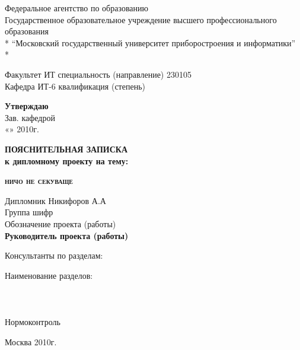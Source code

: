 \begin{titlepage}
\newpage

\begin{center}
Федеральное агентство по образованию \\
\vspace{1cm}
Государственное образовательное учреждение высшего профессионального образования \\*
“Московский государственный университет приборостроения и информатики” \\*
\end{center}

\begin{center}
Факультет ИТ  специальность (направление) 230105 \\
Кафедра ИТ-6  квалификация (степень) \\
\end{center}

\begin{flushright}
\textbf{Утверждаю} \\
Зав. кафедрой \\ 
«»       2010г.
\end{flushright}

\vfill

\begin{center}
\textbf{\Large ПОЯСНИТЕЛЬНАЯ ЗАПИСКА \\
к дипломному проекту на тему: }
\end{center}

\vfill\vfill

\begin{center}
\textsc{\textbf{ничо не секу\linebreak ваще}}
\end{center}

\vfill\vfill

\begin{flushleft}
Дипломник \hrulefill Никифоров А.А \\
Группа \hrulefill   шифр \hrulefill \\
Обозначение проекта (работы) \hrulefill \\
\vfill
\textbf{Руководитель проекта (работы) \hrulefill}
\vfill
\begin{center}
Консультанты по разделам:
\end{center}
Наименование разделов: \\
\hrulefill \\
\hrulefill \\
\hrulefill \\
Нормоконтроль \hrulefill \\
\end{flushleft}

\vspace{\fill}

\begin{center}
Москва 2010г.
\end{center}

\end{titlepage}
